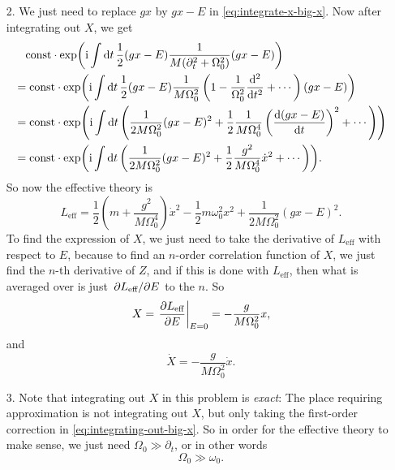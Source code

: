 \documentclass[hyperref, a4paper]{article}
\newcommand*{\ii}{\mathrm{i}}
\newcommand*{\const}{\mathrm{const}}
\begin{document}
\begin{itemize}
\item[2.] We just need to replace $gx$ by $gx - E$ in \eqref{eq:integrate-x-big-x}.
Now after integrating out $X$, we get 
\begin{equation}
    \begin{aligned}
        &\quad \const \cdot \exp(\ii \int \dd{t} \frac{1}{2} 
        (g x - E) \frac{1}{M (\partial_t^2 + \Omega_0^2)} (gx - E)) \\
        &= \const \cdot \exp(\ii \int \dd{t} \frac{1}{2} (gx - E) \frac{1}{M \Omega_0^2} 
        \left( 1 - \frac{1}{\Omega_0^2} \dv[2]{t} + \cdots \right) (gx - E)) \\
        &= \const \cdot \exp(\ii \int \dd{t} \left(
            \frac{1}{2 M \Omega_0^2} (gx - E)^2 
            + \frac{1}{2} \frac{1}{M \Omega_0^4} \left(\dv{(gx - E)}{t}\right)^2 + \cdots
        \right)) \\
        &= \const \cdot \exp(\ii \int \dd{t} \left(
            \frac{1}{2 M \Omega_0^2} (gx - E)^2 
            + \frac{1}{2} \frac{g^2}{M \Omega_0^4} \dot{x}^2 + \cdots
        \right)).
    \end{aligned}
    \label{eq:integrating-out-big-x}
\end{equation}
So now the effective theory is 
\begin{equation}
    L_{\text{eff}} = \frac{1}{2} \left( m + \frac{g^2}{M \Omega_0^4} \right) \dot{x}^2 
    - \frac{1}{2} m \omega_0^2 x^2 + \frac{1}{2 M \Omega_0^2} (gx - E)^2 .
\end{equation}
To find the expression of $X$, we just need to take the derivative of $L_{\text{eff}}$ with respect to $E$,
because to find an $n$-order correlation function of $X$,
we just find the $n$-th derivative of $Z$, 
and if this is done with $L_{\text{eff}}$, 
then what is averaged over is just $\pdv*{L_{\text{eff}}}{E}$ to the $n$.
So 
\begin{equation}
    X = \eval{\pdv{L_{\text{eff}}}{E}}_{E=0} = - \frac{g}{M \Omega_0^2} x,
\end{equation}
and 
\begin{equation}
    \dot{X} = - \frac{g}{M \Omega_0^2} \dot{x}.
\end{equation}

\item[3.] Note that integrating out $X$ in this problem is \emph{exact}:
The place requiring approximation is not integrating out $X$,
but only taking the first-order correction in \eqref{eq:integrating-out-big-x}.
So in order for the effective theory to make sense, 
we just need $\Omega_0 \gg \partial_t$, or in other words 
\begin{equation}
    \Omega_0 \gg \omega_0.
\end{equation}

\end{itemize}
\end{document}

